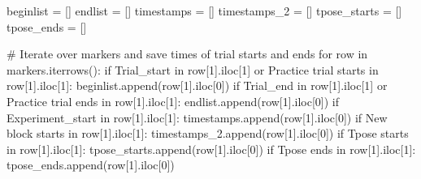 \documentclass[
  letterpaper,
  DIV=11,
  numbers=noendperiod]{scrreprt}
\newenvironment{Shaded}{\begin{snugshade}}{\end{snugshade}}
\newcommand{\CommentTok}[1]{\textcolor[rgb]{0.37,0.37,0.37}{#1}}
\newcommand{\ControlFlowTok}[1]{\textcolor[rgb]{0.00,0.23,0.31}{#1}}
\newcommand{\DecValTok}[1]{\textcolor[rgb]{0.68,0.00,0.00}{#1}}
\newcommand{\KeywordTok}[1]{\textcolor[rgb]{0.00,0.23,0.31}{#1}}
\newcommand{\NormalTok}[1]{\textcolor[rgb]{0.00,0.23,0.31}{#1}}
\newcommand{\OperatorTok}[1]{\textcolor[rgb]{0.37,0.37,0.37}{#1}}
\newcommand{\StringTok}[1]{\textcolor[rgb]{0.13,0.47,0.30}{#1}}
\begin{document}
\begin{Shaded}
\begin{Highlighting}[]
\NormalTok{            beginlist }\OperatorTok{=}\NormalTok{ []}
\NormalTok{            endlist }\OperatorTok{=}\NormalTok{ []}
\NormalTok{            timestamps }\OperatorTok{=}\NormalTok{ []}
\NormalTok{            timestamps\_2 }\OperatorTok{=}\NormalTok{ []}
\NormalTok{            tpose\_starts }\OperatorTok{=}\NormalTok{ []}
\NormalTok{            tpose\_ends }\OperatorTok{=}\NormalTok{ []}

            \CommentTok{\# Iterate over markers and save times of trial starts and ends}
            \ControlFlowTok{for}\NormalTok{ row }\KeywordTok{in}\NormalTok{ markers.iterrows():}
                \ControlFlowTok{if} \StringTok{\textquotesingle{}Trial\_start\textquotesingle{}} \KeywordTok{in}\NormalTok{ row[}\DecValTok{1}\NormalTok{].iloc[}\DecValTok{1}\NormalTok{] }\KeywordTok{or} \StringTok{\textquotesingle{}Practice trial starts\textquotesingle{}} \KeywordTok{in}\NormalTok{ row[}\DecValTok{1}\NormalTok{].iloc[}\DecValTok{1}\NormalTok{]:}
\NormalTok{                    beginlist.append(row[}\DecValTok{1}\NormalTok{].iloc[}\DecValTok{0}\NormalTok{])}
                \ControlFlowTok{if} \StringTok{\textquotesingle{}Trial\_end\textquotesingle{}} \KeywordTok{in}\NormalTok{ row[}\DecValTok{1}\NormalTok{].iloc[}\DecValTok{1}\NormalTok{] }\KeywordTok{or} \StringTok{\textquotesingle{}Practice trial ends\textquotesingle{}} \KeywordTok{in}\NormalTok{ row[}\DecValTok{1}\NormalTok{].iloc[}\DecValTok{1}\NormalTok{]:}
\NormalTok{                    endlist.append(row[}\DecValTok{1}\NormalTok{].iloc[}\DecValTok{0}\NormalTok{])}
                \ControlFlowTok{if} \StringTok{\textquotesingle{}Experiment\_start\textquotesingle{}} \KeywordTok{in}\NormalTok{ row[}\DecValTok{1}\NormalTok{].iloc[}\DecValTok{1}\NormalTok{]:}
\NormalTok{                    timestamps.append(row[}\DecValTok{1}\NormalTok{].iloc[}\DecValTok{0}\NormalTok{])}
                \ControlFlowTok{if} \StringTok{\textquotesingle{}New block starts\textquotesingle{}} \KeywordTok{in}\NormalTok{ row[}\DecValTok{1}\NormalTok{].iloc[}\DecValTok{1}\NormalTok{]:}
\NormalTok{                    timestamps\_2.append(row[}\DecValTok{1}\NormalTok{].iloc[}\DecValTok{0}\NormalTok{])}
                \ControlFlowTok{if} \StringTok{\textquotesingle{}Tpose starts\textquotesingle{}} \KeywordTok{in}\NormalTok{ row[}\DecValTok{1}\NormalTok{].iloc[}\DecValTok{1}\NormalTok{]:}
\NormalTok{                    tpose\_starts.append(row[}\DecValTok{1}\NormalTok{].iloc[}\DecValTok{0}\NormalTok{])}
                \ControlFlowTok{if} \StringTok{\textquotesingle{}Tpose ends\textquotesingle{}} \KeywordTok{in}\NormalTok{ row[}\DecValTok{1}\NormalTok{].iloc[}\DecValTok{1}\NormalTok{]:}
\NormalTok{                    tpose\_ends.append(row[}\DecValTok{1}\NormalTok{].iloc[}\DecValTok{0}\NormalTok{])}
                    

\end{Highlighting}
\end{Shaded}
\end{document}
